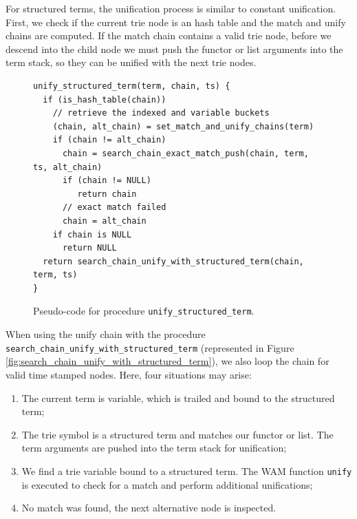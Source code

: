 For structured terms, the unification process is similar to constant unification.
First, we check if the current
trie node is an hash table and the match and unify chains are computed.
If the match chain contains a valid trie node, before we descend into the child
node we must push the functor or list arguments into the term stack, so they can
be unified with the next trie nodes.

\begin{figure}[ht]
\begin{Verbatim}
unify_structured_term(term, chain, ts) {
  if (is_hash_table(chain))
    // retrieve the indexed and variable buckets
    (chain, alt_chain) = set_match_and_unify_chains(term)
    if (chain != alt_chain)
      chain = search_chain_exact_match_push(chain, term, ts, alt_chain)
      if (chain != NULL)
         return chain
      // exact match failed
      chain = alt_chain
    if chain is NULL
      return NULL
  return search_chain_unify_with_structured_term(chain, term, ts)
}
\end{Verbatim}
\caption{Pseudo-code for procedure \texttt{unify\_structured\_term}.}
\label{fig:unify_structured_term}
\end{figure}

When using the unify chain with the procedure \texttt{search\_chain\_unify\_with\_structured\_term}
(represented in Figure \ref{fig:search_chain_unify_with_structured_term}),
we also loop the chain for valid time stamped nodes.
Here, four situations may arise:

\begin{enumerate}
  \item The current term is variable, which is trailed and bound to the structured term;
  \item The trie symbol is a structured term and matches our functor or list.
  The term arguments are pushed into the term stack for unification;
  \item We find a trie variable bound to a structured term. The WAM function \texttt{unify}
  is executed to check for a match and perform additional unifications;
  \item No match was found, the next alternative node is inspected.
\end{enumerate}

